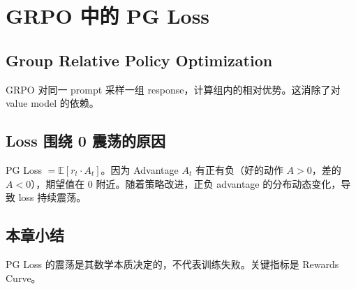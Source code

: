 \section{GRPO 中的 PG Loss}
\subsection{Group Relative Policy Optimization}
GRPO 对同一 prompt 采样一组 response，计算组内的相对优势。这消除了对 value model 的依赖。

\subsection{Loss 围绕 0 震荡的原因}
PG Loss $= \mathbb{E}[r_t \cdot A_t]$。因为 Advantage $A_t$ 有正有负（好的动作 $A > 0$，差的 $A < 0$），期望值在 0 附近。随着策略改进，正负 advantage 的分布动态变化，导致 loss 持续震荡。

\subsection{本章小结}
PG Loss 的震荡是其数学本质决定的，不代表训练失败。关键指标是 Rewards Curve。

